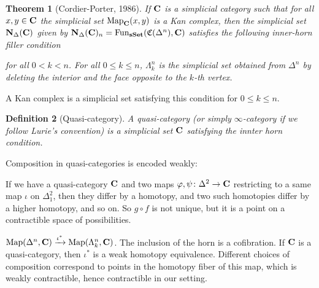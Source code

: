 \documentclass[A4paper, british, reqno]{amsart}
\theoremstyle{darkgreentheorem}
\newtheorem{thm}{Theorem}[section]
\theoremstyle{darkbluedefinition}
\newtheorem{defn}[thm]{Definition}
\theoremstyle{darkredexample}
\theoremstyle{remark}
\DeclareMathOperator{\Fun}{Fun}
\DeclareMathOperator{\Map}{Map}
\newcommand{\sSet}{\mathbf{sSet}}
\newcommand{\1}{\mathbbm{1}}
\begin{document}
\begin{thm}[Cordier-Porter, 1986]
    If $\mathbf{C}$ is a simplicial category such that for all $x,y\in \mathbf{C}$ the simplicial set $\Map_{\bfC}(x,y)$ is a Kan complex, then the simplicial set $\mathbf{N}_{\Delta}(\mathbf{C})$ given by $\bfN_{\Delta}(\bfC)_{n}=\Fun_{\sSet}(\mathfrak{C}(\Delta^{n}),\bfC)$ satisfies the following inner-horn filler condition
    \begin{center}
    \end{center}
    for all $0<k<n$.
    For all $0\leqslant k\leqslant n$, $\Lambda_{k}^{n}$ is the simplicial set obtained from $\Delta^{n}$ by deleting the interior and the face opposite to the $k$-th vertex.
\end{thm}

A Kan complex is a simplicial set satisfying this condition for $0\leqslant k\leqslant n$.

\begin{defn}[Quasi-category]
    A \textit{quasi-category} (or simply $\infty$-category if we follow Lurie's convention) is a simplicial set $\mathbf{C}$ satisfying the innter horn condition.
\end{defn}

Composition in quasi-categories is encoded weakly:
\begin{center}
\end{center}

If we have a quasi-category $\mathbf{C}$ and two maps $\varphi,\psi\colon \Delta^{2}\to \mathbf{C}$ restricting to a same map $\iota$ on $\Delta^{2}_{1}$, then they differ by a homotopy, and two such homotopies differ by a higher homotopy, and so on.
So $g\circ f$ is not unique, but it is a point on a contractible space of possibilities.

$\Map(\Delta^{n},\bfC)\xrightarrow{\iota^{*}} \Map(\Lambda_{k}^{n},\bfC)$.
The inclusion of the horn is a cofibration.
If $\mathbf{C}$ is a quasi-category, then $\iota^{*}$ is a weak homotopy equivalence.
Different choices of composition correspond to points in the homotopy fiber of this map, which is weakly contractible, hence contractible in our setting.
\end{document}
